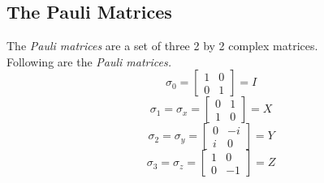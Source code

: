 \documentclass{article}
\begin{document}
\subsection{The Pauli Matrices}
The \textit{Pauli matrices} are a set of three 2 by 2 complex matrices. \\
Following are the \textit{Pauli matrices.} \\
\begin{equation}
    \sigma_0 = 
    \begin{bmatrix}
        1 & 0 \\
        0 & 1
    \end{bmatrix}
    =
    I
\end{equation}
\begin{equation}
    \sigma_1 =
    \sigma_x = 
    \begin{bmatrix}
        0 & 1 \\
        1 & 0
    \end{bmatrix}
    = X
\end{equation}
\begin{equation}
    \sigma_2 =
    \sigma_y =
    \begin{bmatrix}
        0 & -i \\
        i & 0
    \end{bmatrix}
    = Y
\end{equation}
\begin{equation}
    \sigma_3 =
    \sigma_z =
    \begin{bmatrix}
        1 & 0 \\
        0 & -1
    \end{bmatrix}
    = Z
\end{equation}
\end{document}
